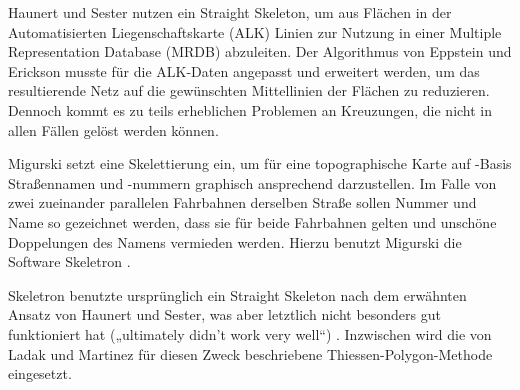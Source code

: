 \documentclass[../main/thesis.tex]{subfiles}
\begin{document}

Haunert und Sester nutzen ein Straight Skeleton, um aus Flächen in der Automatisierten Liegenschaftskarte (ALK) Linien zur Nutzung in einer Multiple Representation Database (MRDB) abzuleiten. Der Algorithmus von Eppstein und Erickson  musste für die ALK-Daten angepasst und erweitert werden, um das resultierende Netz auf die gewünschten Mittellinien der Flächen zu reduzieren. Dennoch kommt es zu teils erheblichen Problemen an Kreuzungen, die nicht in allen Fällen gelöst werden können. 


Migurski setzt eine Skelettierung ein, um für eine topographische Karte auf \osm-Basis Straßennamen und -nummern graphisch ansprechend darzustellen. Im Falle von zwei zueinander parallelen Fahrbahnen derselben Straße sollen Nummer und Name so gezeichnet werden, dass sie für beide Fahrbahnen gelten und unschöne Doppelungen des Namens vermieden werden. Hierzu benutzt Migurski die Software Skeletron . 


Skeletron benutzte ursprünglich ein Straight Skeleton nach dem erwähnten Ansatz von Haunert und Sester, was aber letztlich nicht besonders gut funktioniert hat („ultimately didn't work very well“) . Inzwischen wird die von Ladak und Martinez für diesen Zweck beschriebene Thiessen-Polygon-Methode eingesetzt.

\end{document}

